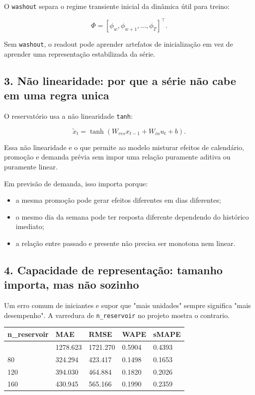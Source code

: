 \documentclass[12pt]{article}
\providecommand{\tightlist}{%
  \setlength{\itemsep}{0pt}\setlength{\parskip}{0pt}}
\begin{document}
O \texttt{washout} separa o regime transiente inicial da dinâmica útil para treino:

\[
\Phi = [\phi_w, \phi_{w+1}, \dots, \phi_T]^\top.
\]

Sem \texttt{washout}, o readout pode aprender artefatos de inicialização em vez de aprender uma representação estabilizada da série.

\subsection{3. Não linearidade: por que a série não cabe em uma regra unica}\label{3-nuxe3o-linearidade-por-que-a-suxe9rie-nuxe3o-cabe-em-uma-regra-unica}

O reservatório usa a não linearidade \texttt{tanh}:

\[
\widetilde{x}_t = \tanh(W_{res} x_{t-1} + W_{in} u_t + b).
\]

Essa não linearidade e o que permite ao modelo misturar efeitos de calendário, promoção e demanda prévia sem impor uma relação puramente aditiva ou puramente linear.

Em previsão de demanda, isso importa porque:

\begin{itemize}
\tightlist
\item
  a mesma promoção pode gerar efeitos diferentes em dias diferentes;
\item
  o mesmo dia da semana pode ter resposta diferente dependendo do histórico imediato;
\item
  a relação entre passado e presente não precisa ser monotona nem linear.
\end{itemize}

\subsection{4. Capacidade de representação: tamanho importa, mas não sozinho}\label{4-capacidade-de-representauxe7uxe3o-tamanho-importa-mas-nuxe3o-sozinho}

Um erro comum de iniciantes e supor que "mais unidades" sempre significa "mais desempenho". A varredura de \texttt{n\_reservoir} no projeto mostra o contrario.

\begin{longtable}[]{@{}lllll@{}}
\toprule\noalign{}
n\_reservoir & MAE & RMSE & WAPE & sMAPE \\
\midrule\noalign{}
\endhead
\bottomrule\noalign{}
\endlastfoot
40 & 1278.623 & 1721.270 & 0.5904 & 0.4393 \\
80 & 324.294 & 423.417 & 0.1498 & 0.1653 \\
120 & 394.030 & 464.884 & 0.1820 & 0.2026 \\
160 & 430.945 & 565.166 & 0.1990 & 0.2359 \\
\end{longtable}
\end{document}
